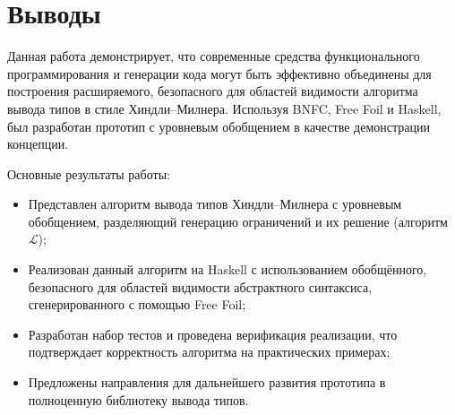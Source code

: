 \chapter{Выводы}
\label{chap:conclusion}

Данная работа демонстрирует, что современные средства функционального программирования и генерации кода могут быть эффективно объединены для построения расширяемого, безопасного для областей видимости алгоритма вывода типов в стиле Хиндли–Милнера. Используя BNFC, Free Foil и Haskell, был разработан прототип с уровневым обобщением в качестве демонстрации концепции.

Основные результаты работы:

\begin{itemize}
  \item Представлен алгоритм вывода типов Хиндли–Милнера с уровневым обобщением, разделяющий генерацию ограничений и их решение (алгоритм $\mathcal{L}$);
  \item Реализован данный алгоритм на Haskell с использованием обобщённого, безопасного для областей видимости абстрактного синтаксиса, сгенерированного с помощью Free Foil;
  \item Разработан набор тестов и проведена верификация реализации, что подтверждает корректность алгоритма на практических примерах;
  \item Предложены направления для дальнейшего развития прототипа в полноценную библиотеку вывода типов.
\end{itemize}
